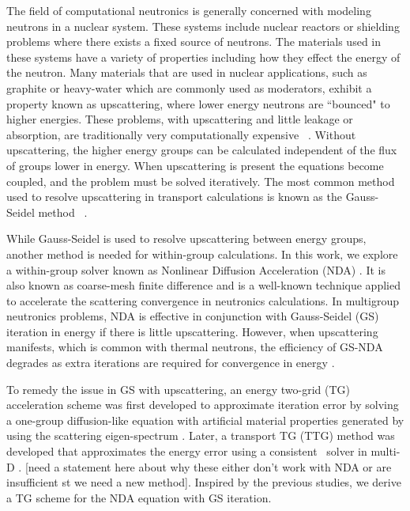 

The field of computational neutronics is generally concerned with modeling neutrons in a nuclear system. These systems include nuclear reactors or shielding problems where there exists a fixed source of neutrons. The materials used in these systems have a variety of properties including how they effect the energy of the neutron. Many materials that are used in nuclear applications, such as graphite or heavy-water which are commonly used as moderators, exhibit a property known as upscattering, where lower energy neutrons are ``bounced" to higher energies. These problems, with upscattering and little leakage or absorption, are traditionally very computationally expensive ~\cite{morel-upscat}. Without upscattering, the higher energy groups can be calculated independent of the flux of groups lower in energy. When upscattering is present the equations become coupled, and the problem must be solved iteratively. The most common method used to resolve upscattering in transport calculations is known as the Gauss-Seidel method ~\cite{lewis-miller}. 

While Gauss-Seidel is used to resolve upscattering between energy groups, another method is needed for within-group calculations. In this work, we explore a within-group solver known as Nonlinear Diffusion Acceleration (NDA) \cite{morel-holo, Wang2013}. It is also known as coarse-mesh finite difference and is a well-known technique applied to accelerate the scattering convergence in neutronics calculations. In multigroup neutronics problems, NDA is effective in conjunction with Gauss-Seidel (GS) iteration in energy if there is little upscattering. However, when upscattering manifests, which is common with thermal neutrons, the efficiency of GS-NDA degrades as extra iterations are required for convergence in energy \cite{park-nda}.


To remedy the issue in GS with upscattering, an energy two-grid (TG) acceleration scheme was first developed to approximate iteration error by solving a one-group diffusion-like equation with artificial material properties generated by using the scattering eigen-spectrum \cite{morel-upscat}. Later, a transport TG (TTG) method was developed that approximates the energy error using a consistent \sn\ solver in multi-D \cite{evans-upscat}. [need a statement here about why these either don't work with NDA or are insufficient st we need a new method]. Inspired by the previous studies, we derive a TG scheme for the NDA equation with GS iteration.

